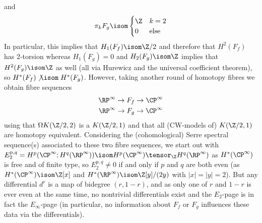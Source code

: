\begin{solution}
\begin{equation*}
	\end{equation*}
	and
	\begin{equation*}
		\pi_k F_g \isom \begin{cases}
			\Z 		& k = 2 \\
			0 		& \text{else}
		\end{cases}
	\end{equation*}
	In particular, this implies that $H_1(F_f) \isom \Zn{2}$ and therefore that $H^2(F_f)$ has 2-torsion whereas $H_1(F_g) = 0$ and $H_2(F_g) \isom \Z$ implies that $H^2(F_g) \isom \Z$ as well (all via Hurewicz and the universal coefficient theorem), so $H^*(F_f) \mathrel{\not\isom} H^*(F_g)$.
	However, taking another round of homotopy fibres we obtain fibre sequences
	\begin{gather*}
		\RP^\infty \to F_f \to \CP^\infty \\
		\RP^\infty \to F_g \to \CP^\infty 
	\end{gather*}
	using that $\Omega K(\Zn{2}, 2)$ is a $K(\Zn{2}, 1)$ and that all (CW-models of) $K(\Zn{2}, 1)$ are homotopy equivalent.
	Considering the (cohomological) Serre spectral sequence(s) associated to these two fibre sequences, we start out with $E_2^{p, q} = H^p(\CP^\infty; H^q(\RP^\infty)) \isom H^p(\CP^\infty) \tensor_{\Z} H^q(\RP^\infty)$ as $H^*(\CP^\infty)$ is free and of finite type, so $E_2^{p, q} \neq 0$ if and only if $p$ and $q$ are both even (as $H^*(\CP^\infty) \isom \Z[x]$ and $H^*(\RP^\infty) \isom \Z[y] / (2y)$ with $|x| = |y| = 2$).
	But any differential $d^r$ is a map of bidegree $(r, 1 - r)$, and as only one of $r$ and $1 - r$ is ever even at the same time, no nontrivial differentials exist and the $E_2$-page is in fact the $E_\infty$-page (in particular, no information about $F_f$ or $F_g$ influences these data via the differentials).
\end{solution}

